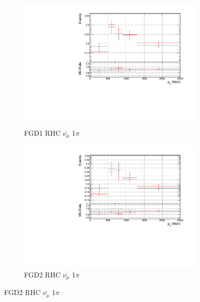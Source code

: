 \begin{figure}[!h]
\begin{subfigure}{0.49\textwidth}
  \centering
  \includegraphics[width=\textwidth]{figs/prioronly1D_p_FGD1_anti-numuCC_1pi}
  \caption{FGD1 RHC $\bar{\nu_{\mu}}$ 1$\pi$}
\end{subfigure}
\centering
\begin{subfigure}{0.49\textwidth}
  \centering
  \includegraphics[width=\textwidth]{figs/prioronly1D_p_FGD2_anti-numuCC_1pi}
  \caption{FGD2 RHC $\bar{\nu_{\mu}}$ 1$\pi$}
\end{subfigure}


\end{figure}
